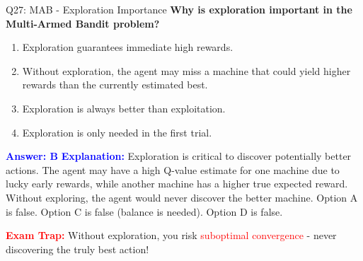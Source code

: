 \documentclass[8pt]{beamer}
\begin{document}
	\begin{frame}{Q27: MAB - Exploration Importance}
		\fontsize{6.5}{7.5}\selectfont
		\textbf{Why is exploration important in the Multi-Armed Bandit problem?}
		
		\begin{enumerate}
			\item Exploration guarantees immediate high rewards.
			\item Without exploration, the agent may miss a machine that could yield higher rewards than the currently estimated best.
			\item Exploration is always better than exploitation.
			\item Exploration is only needed in the first trial.
		\end{enumerate}
		
		\vspace{0.1cm}
		\textcolor{blue}{\textbf{Answer: B}}
		\vspace{0.1cm}
		\textcolor{blue}{\textbf{Explanation:}} Exploration is critical to discover potentially better actions. The agent may have a high Q-value estimate for one machine due to lucky early rewards, while another machine has a higher true expected reward. Without exploring, the agent would never discover the better machine. Option A is false. Option C is false (balance is needed). Option D is false.
		
		\textcolor{red}{\textbf{Exam Trap:}} Without exploration, you risk \textcolor{red}{suboptimal convergence} - never discovering the truly best action!
	\end{frame}
	
\end{document}
